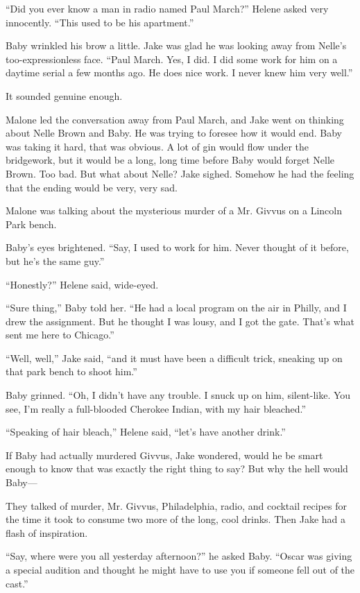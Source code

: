 \documentclass{novel}
\begin{document}
“Did you ever know a man in radio named Paul March?” Helene asked very innocently. “This used to be his apartment.”

Baby wrinkled his brow a little. Jake was glad he was looking away from Nelle’s too-expressionless face. “Paul March. Yes, I did. I did some work for him on a daytime serial a few months ago. He does nice work. I never knew him very well.”

It sounded genuine enough.

Malone led the conversation away from Paul March, and Jake went on thinking about Nelle Brown and Baby. He was trying to foresee how it would end. Baby was taking it hard, that was obvious. A lot of gin would flow under the bridgework, but it would be a long, long time before Baby would forget Nelle Brown. Too bad. But what about Nelle? Jake sighed. Somehow he had the feeling that the ending would be very, very sad.

Malone was talking about the mysterious murder of a Mr. Givvus on a Lincoln Park bench.

Baby’s eyes brightened. “Say, I used to work for him. Never thought of it before, but he’s the same guy.”

“Honestly?” Helene said, wide-eyed.

“Sure thing,” Baby told her. “He had a local program on the air in Philly, and I drew the assignment. But he thought I was lousy, and I got the gate. That’s what sent me here to Chicago.”

“Well, well,” Jake said, “and it must have been a difficult trick, sneaking up on that park bench to shoot him.”

Baby grinned. “Oh, I didn’t have any trouble. I snuck up on him, silent-like. You see, I’m really a full-blooded Cherokee Indian, with my hair bleached.”

“Speaking of hair bleach,” Helene said, “let’s have another drink.”

If Baby had actually murdered Givvus, Jake wondered, would he be smart enough to know that was exactly the right thing to say? But why the hell would Baby—

They talked of murder, Mr. Givvus, Philadelphia, radio, and cocktail recipes for the time it took to consume two more of the long, cool drinks. Then Jake had a flash of inspiration.

“Say, where were you all yesterday afternoon?” he asked Baby. “Oscar was giving a special audition and thought he might have to use you if someone fell out of the cast.”
\end{document}
